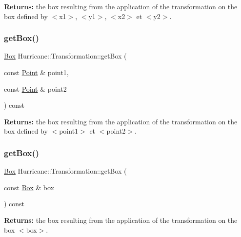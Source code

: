 {\bfseries Returns\+:} the box resulting from the application of the transformation on the box defined by {\ttfamily $<$x1$>$}, {\ttfamily $<$y1$>$}, {\ttfamily $<$x2$>$} et {\ttfamily $<$y2$>$}. \mbox{\label{classHurricane_1_1Transformation_a4d3ad1601d31e05c76bda4b417445aff}} 
\subsubsection{\texorpdfstring{get\+Box()}{getBox()}\hspace{0.1cm}{\footnotesize\ttfamily [2/3]}}
{\footnotesize\ttfamily \mbox{\hyperlink{classHurricane_1_1Box}{Box}} Hurricane\+::\+Transformation\+::get\+Box (\begin{DoxyParamCaption}\item[{const \mbox{\hyperlink{classHurricane_1_1Point}{Point}} \&}]{point1,  }\item[{const \mbox{\hyperlink{classHurricane_1_1Point}{Point}} \&}]{point2 }\end{DoxyParamCaption}) const}

{\bfseries Returns\+:} the box resulting from the application of the transformation on the box defined by {\ttfamily $<$point1$>$} et {\ttfamily $<$point2$>$}. \mbox{\label{classHurricane_1_1Transformation_a051ddd67572c50b3b8edf75f790006e2}} 
\subsubsection{\texorpdfstring{get\+Box()}{getBox()}\hspace{0.1cm}{\footnotesize\ttfamily [3/3]}}
{\footnotesize\ttfamily \mbox{\hyperlink{classHurricane_1_1Box}{Box}} Hurricane\+::\+Transformation\+::get\+Box (\begin{DoxyParamCaption}\item[{const \mbox{\hyperlink{classHurricane_1_1Box}{Box}} \&}]{box }\end{DoxyParamCaption}) const}

{\bfseries Returns\+:} the box resulting from the application of the transformation on the box {\ttfamily $<$box$>$}. \mbox{\label{classHurricane_1_1Transformation_a12ba0cbe9154661e704ce0f2638f860f}} 
